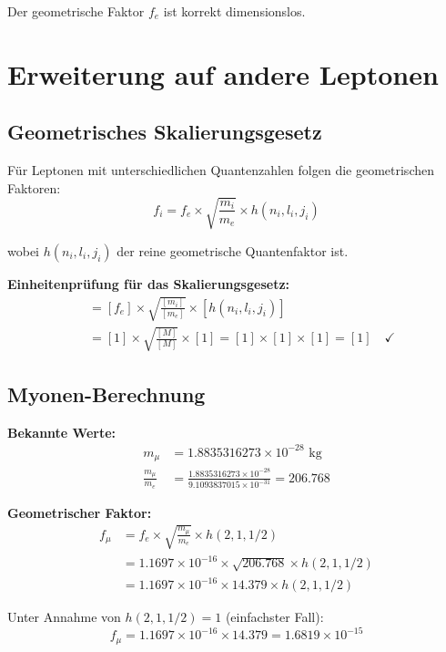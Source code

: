 \documentclass[12pt,a4paper]{article}
\theoremstyle{definition}
\begin{document}
	Der geometrische Faktor $f_e$ ist korrekt dimensionslos.
	
	\section{Erweiterung auf andere Leptonen}
	
	\subsection{Geometrisches Skalierungsgesetz}
	
	Für Leptonen mit unterschiedlichen Quantenzahlen folgen die geometrischen Faktoren:
	\begin{equation}
		f_i = f_e \times \sqrt{\frac{m_i}{m_e}} \times h(n_i, l_i, j_i)
	\end{equation}
	
	wobei $h(n_i, l_i, j_i)$ der reine geometrische Quantenfaktor ist.
	
	\textbf{Einheitenprüfung für das Skalierungsgesetz:}
	\begin{align}
		[f_i] &= [f_e] \times \sqrt{\frac{[m_i]}{[m_e]}} \times [h(n_i, l_i, j_i)] \\
		&= [1] \times \sqrt{\frac{[M]}{[M]}} \times [1] = [1] \times [1] \times [1] = [1] \quad \checkmark
	\end{align}
	
	\subsection{Myonen-Berechnung}
	
	\textbf{Bekannte Werte:}
	\begin{align}
		m_\mu &= 1.8835316273 \times 10^{-28} \text{ kg}\\
		\frac{m_\mu}{m_e} &= \frac{1.8835316273 \times 10^{-28}}{9.1093837015 \times 10^{-31}} = 206.768
	\end{align}
	
	\textbf{Geometrischer Faktor:}
	\begin{align}
		f_\mu &= f_e \times \sqrt{\frac{m_\mu}{m_e}} \times h(2,1,1/2)\\
		&= 1.1697 \times 10^{-16} \times \sqrt{206.768} \times h(2,1,1/2)\\
		&= 1.1697 \times 10^{-16} \times 14.379 \times h(2,1,1/2)
	\end{align}
	
	Unter Annahme von $h(2,1,1/2) = 1$ (einfachster Fall):
	\begin{equation}
		f_\mu = 1.1697 \times 10^{-16} \times 14.379 = 1.6819 \times 10^{-15}
	\end{equation}
	
\end{document}
